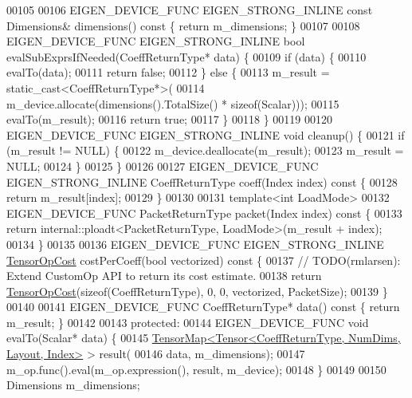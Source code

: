 \begin{DoxyCode}
00105 
00106   EIGEN\_DEVICE\_FUNC EIGEN\_STRONG\_INLINE \textcolor{keyword}{const} Dimensions& dimensions()\textcolor{keyword}{ const }\{ \textcolor{keywordflow}{return} m\_dimensions; \}
00107 
00108   EIGEN\_DEVICE\_FUNC EIGEN\_STRONG\_INLINE \textcolor{keywordtype}{bool} evalSubExprsIfNeeded(CoeffReturnType* data) \{
00109     \textcolor{keywordflow}{if} (data) \{
00110       evalTo(data);
00111       \textcolor{keywordflow}{return} \textcolor{keyword}{false};
00112     \} \textcolor{keywordflow}{else} \{
00113       m\_result = \textcolor{keyword}{static\_cast<}CoeffReturnType*\textcolor{keyword}{>}(
00114           m\_device.allocate(dimensions().TotalSize() * \textcolor{keyword}{sizeof}(Scalar)));
00115       evalTo(m\_result);
00116       \textcolor{keywordflow}{return} \textcolor{keyword}{true};
00117     \}
00118   \}
00119 
00120   EIGEN\_DEVICE\_FUNC EIGEN\_STRONG\_INLINE \textcolor{keywordtype}{void} cleanup() \{
00121     \textcolor{keywordflow}{if} (m\_result != NULL) \{
00122       m\_device.deallocate(m\_result);
00123       m\_result = NULL;
00124     \}
00125   \}
00126 
00127   EIGEN\_DEVICE\_FUNC EIGEN\_STRONG\_INLINE CoeffReturnType coeff(Index index)\textcolor{keyword}{ const }\{
00128     \textcolor{keywordflow}{return} m\_result[index];
00129   \}
00130 
00131   \textcolor{keyword}{template}<\textcolor{keywordtype}{int} LoadMode>
00132   EIGEN\_DEVICE\_FUNC PacketReturnType packet(Index index)\textcolor{keyword}{ const }\{
00133     \textcolor{keywordflow}{return} internal::ploadt<PacketReturnType, LoadMode>(m\_result + index);
00134   \}
00135 
00136   EIGEN\_DEVICE\_FUNC EIGEN\_STRONG\_INLINE \hyperlink{class_eigen_1_1_tensor_op_cost}{TensorOpCost} costPerCoeff(\textcolor{keywordtype}{bool} vectorized)\textcolor{keyword}{ const }\{
00137     \textcolor{comment}{// TODO(rmlarsen): Extend CustomOp API to return its cost estimate.}
00138     \textcolor{keywordflow}{return} \hyperlink{class_eigen_1_1_tensor_op_cost}{TensorOpCost}(\textcolor{keyword}{sizeof}(CoeffReturnType), 0, 0, vectorized, PacketSize);
00139   \}
00140 
00141   EIGEN\_DEVICE\_FUNC CoeffReturnType* data()\textcolor{keyword}{ const }\{ \textcolor{keywordflow}{return} m\_result; \}
00142 
00143  \textcolor{keyword}{protected}:
00144   EIGEN\_DEVICE\_FUNC \textcolor{keywordtype}{void} evalTo(Scalar* data) \{
00145     \hyperlink{class_eigen_1_1_tensor_map}{TensorMap<Tensor<CoeffReturnType, NumDims, Layout, Index>}
       > result(
00146         data, m\_dimensions);
00147     m\_op.func().eval(m\_op.expression(), result, m\_device);
00148   \}
00149 
00150   Dimensions m\_dimensions;

\end{DoxyCode}
